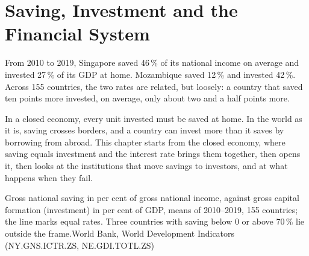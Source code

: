 \chapter{Saving, Investment and the Financial System}\label{ch:g12:saving-and-investment}

From 2010 to 2019, Singapore saved 46\,\% of its national income on average and invested 27\,\% of its GDP at home. Mozambique saved 12\,\% and invested 42\,\%. Across 155
countries, the two rates are related, but loosely: a country that saved ten points more invested, on average, only about two and a half points more.

In a closed economy, every unit invested must be saved at home. In the world as it is, saving crosses borders, and a country can invest more than it saves by borrowing
from abroad. This chapter starts from the closed economy, where saving equals investment and the interest rate brings them together, then opens it, then looks at the
institutions that move savings to investors, and at what happens when they fail.

\begin{openingchart}{Gross national saving in per cent of gross national income, against gross capital formation (investment) in per cent of GDP, means of 2010--2019,
155 countries; the line marks equal rates.
Three countries with saving below 0 or above 70\,\% lie outside the frame.}{World Bank, World Development Indicators (NY.GNS.ICTR.ZS, NE.GDI.TOTL.ZS)}
\end{openingchart}

